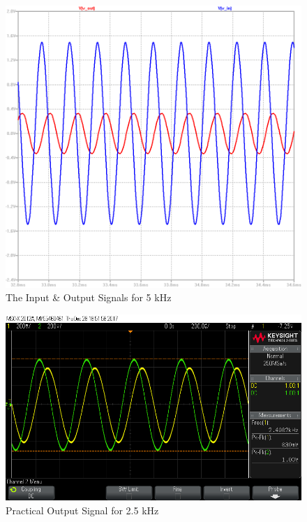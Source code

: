 \documentclass[paper]{IEEEtran}
\begin{document}
\begin{figure}[H]
	\setlength{\unitlength}{\textwidth}
	\center 
	\includegraphics[width=0.45\unitlength]{lpf_op5.png}
	\caption{\label{fig:lpfop5}The Input \& Output Signals for 5 kHz}
\end{figure} 


	

\begin{figure}[H]
	\setlength{\unitlength}{\textwidth}
	\center 
	\includegraphics[width=0.45\unitlength]{lpf_osc4.png}
	\caption{\label{fig:lpfosc4}Practical Output Signal for 2.5 kHz}
\end{figure} 
	
\end{document}
